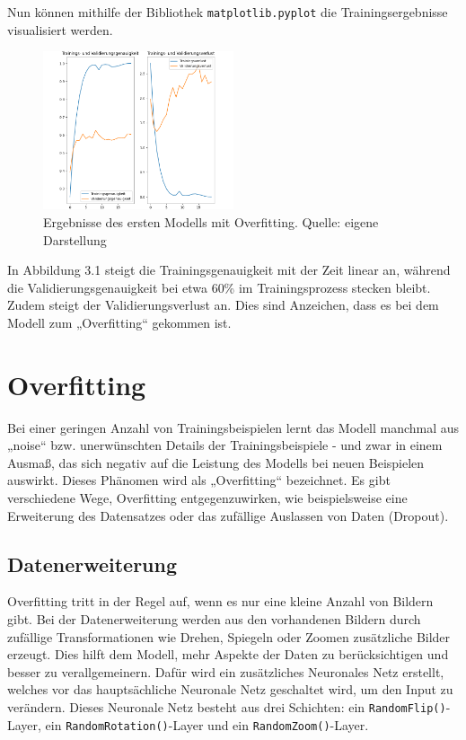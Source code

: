 \documentclass[11pt,oneside]{report}
\begin{document}
Nun können mithilfe der Bibliothek \verb+matplotlib.pyplot+ die Trainingsergebnisse visualisiert werden.
\begin{figure}[H]
	\center
	\caption{Ergebnisse des ersten Modells mit Overfitting. Quelle: eigene Darstellung}
	\includegraphics[width=0.5\textwidth]{model_overfitting}
\end{figure}
In Abbildung 3.1 steigt die Trainingsgenauigkeit mit der Zeit linear an, während die Validierungsgenauigkeit bei etwa 60\% im Trainingsprozess stecken bleibt. Zudem steigt der Validierungsverlust an. Dies sind Anzeichen, dass es bei dem Modell zum „Overfitting“ gekommen ist.

\section{Overfitting}
Bei einer geringen Anzahl von Trainingsbeispielen lernt das Modell manchmal aus „noise“ bzw. unerwünschten Details der Trainingsbeispiele - und zwar in einem Ausmaß, das sich negativ auf die Leistung des Modells bei neuen Beispielen auswirkt. Dieses Phänomen wird als „Overfitting“ bezeichnet. Es gibt verschiedene Wege, Overfitting entgegenzuwirken, wie beispielsweise eine Erweiterung des Datensatzes oder das zufällige Auslassen von Daten (Dropout).

\subsection{Datenerweiterung}
Overfitting tritt in der Regel auf, wenn es nur eine kleine Anzahl von Bildern gibt. Bei der Datenerweiterung werden aus den vorhandenen Bildern durch zufällige Transformationen wie Drehen, Spiegeln oder Zoomen zusätzliche Bilder erzeugt. Dies hilft dem Modell, mehr Aspekte der Daten zu berücksichtigen und besser zu verallgemeinern. Dafür wird ein zusätzliches Neuronales Netz erstellt, welches vor das hauptsächliche Neuronale Netz geschaltet wird, um den Input zu verändern. Dieses Neuronale Netz besteht aus drei Schichten: ein \verb+RandomFlip()+-Layer, ein \verb+RandomRotation()+-Layer und ein \verb+RandomZoom()+-Layer.
\end{document}
